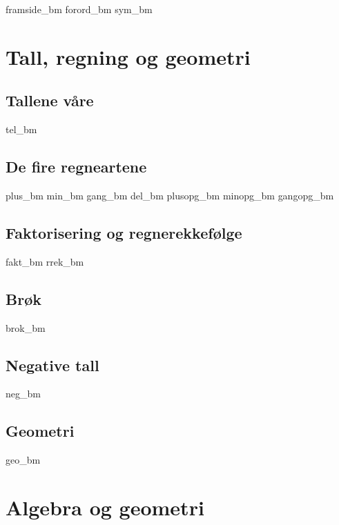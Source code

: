 




{framside_bm}
{forord_bm}
{sym_bm}
\newpage

{\footnotesize \tableofcontents}
\newpage
\part{Tall, regning og geometri}

\chapter{Tallene våre \label{Talavare}}
\newpage
{tel_bm}
%
\chapter{De fire regneartene \label{Rekneartane}}
\newpage
{plus_bm}
{min_bm}
{gang_bm}
{del_bm}
\opgt
{plusopg_bm}
{minopg_bm}
{gangopg_bm}

\chapter{Faktorisering og regnerekkefølge}
\newpage
{fakt_bm}
{rrek_bm}

\chapter{Brøk}
\newpage
{brok_bm}

\chapter{Negative tall \label{Negtal}}
\newpage
{neg_bm}


\chapter{Geometri}
\newpage
{geo_bm}

\part{Algebra og geometri \label{Del2}}
